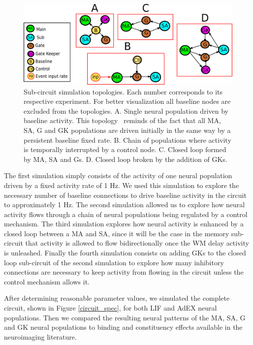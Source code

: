 \documentclass[10pt]{article}
\begin{document}
\begin{figure}[h!]
  \begin{center}
    \includegraphics[width=0.70\columnwidth]{figures/sub_circuits3/sub_circuits3}
    \caption{Sub-circuit simulation topologies.
      Each number corresponds to its respective experiment.
      For better visualization all baseline nodes are excluded from the topologies.
      A. Single neural population driven by baseline activity.
      This topology~ reminds of the fact that all MA, SA, G and GK populations are driven initially in the same way by a persistent baseline fixed rate.
      B. Chain of populations where activity is temporally interrupted by a control node.
      C. Closed loop formed by MA, SA and Gs.
      D. Closed loop broken by the addition of GKs. {\label{sub_circuits}}%
    }
  \end{center}
\end{figure}

The first simulation simply consists of the activity of one neural population driven by a fixed activity rate of 1 Hz.
We used this simulation to explore the necessary number of baseline connections to drive baseline activity in the circuit to approximately 1 Hz.
The second simulation allowed us to explore how neural activity flows through a chain of neural populations being regulated by a control mechanism.
The third simulation explores how neural activity is enhanced by a closed loop between a MA and SA, since it will be the case in the memory sub-circuit that activity is allowed to flow bidirectionally once the WM delay activity is unleashed.
Finally the fourth simulation consists on adding GKs to the closed loop sub-circuit of the second simulation to explore how many inhibitory connections are necessary to keep activity from flowing in the circuit unless the control mechanism allows it.

After determining reasonable parameter values, we simulated the complete circuit, shown in Figure \ref{circuit_spec}, for both LIF and AdEX neural populations.
Then we compared the resulting neural patterns of the MA, SA, G and GK neural populations to binding and constituency effects available in the neuroimaging literature.
\end{document}
